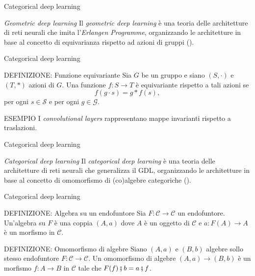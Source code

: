 \documentclass{beamer}
\begin{document}
\begin{frame}{Categorical deep learning}
    \begin{block}{\textit{Geometric deep learning}}
        Il \textit{geometric deep learning} è una teoria delle architetture di reti neurali che imita l'\textit{Erlangen Programme}, organizzando le architetture in base al concetto di equivarianza rispetto ad azioni di gruppi (\cite{bronstein2021geometric}).
    \end{block}
\end{frame}

\begin{frame}{Categorical deep learning}
    \begin{block}{DEFINIZIONE: Funzione equivariante}
        Sia $G$ be un gruppo e siano $(S, \cdot)$ e $(T, \ast)$ azioni di $G$. Una funzione $f: S \to T$ è equivariante rispetto a tali azioni se 
        \[f(g \cdot s) = g \ast f(s),\] 
        per ogni $s \in \mathcal{S}$ e per ogni $g \in \mathcal{G}$.
    \end{block}

    \begin{block}{ESEMPIO}
        I \textit{convolutional layers} rappresentano mappe invarianti rispetto a traslazioni.
    \end{block}
\end{frame}

\begin{frame}{Categorical deep learning}
    \begin{block}{\textit{Categorical deep learning}}
        Il \textit{categorical deep learning} è una teoria delle architetture di reti neurali che generalizza il GDL, organizzando le architetture in base al concetto di omomorfismo di (co)algebre categoriche (\cite{gavranovicposition}).
    \end{block}
\end{frame}

\begin{frame}{Categorical deep learning}
    \begin{block}{DEFINIZIONE: Algebra su un endofuntore}
        Sia $F: \mathcal{C} \to \mathcal{C}$ un endofuntore. Un'algebra su $F$ è una coppia $(A,a)$ dove $A$ è un oggetto di $\mathcal{C}$ e $a: F(A) \to A$ è un morfismo in $\mathcal{C}$.
    \end{block}

    \begin{block}{DEFINIZIONE: Omomorfismo di algebre}
        Siano $(A,a)$ e $(B,b)$ algebre sollo stesso endofuntore $F: \mathcal{C} \to \mathcal{C}$. Un omomorfismo di algebre $(A,a) \to (B,b)$ è un morfismo $f: A \to B$ in $\mathcal{C}$ tale che $F(f) \fatsemi b =  a \fatsemi f$.
    \end{block}
\end{frame}
\end{document}
